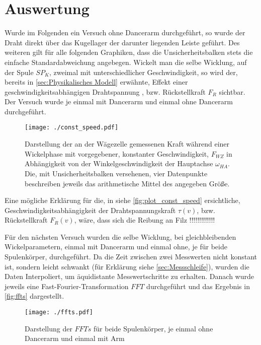 \section{Auswertung}
\label{sec:Auswertung}

Wurde im Folgenden ein Versuch ohne Dancerarm durchgeführt, so wurde der Draht direkt über das Kugellager der darunter liegenden Leiste geführt. Des weiteren gilt für alle folgenden Graphiken, dass die Unsicherheitsbalken stets die einfache Standardabweichung angebegen.\newline
Wickelt man die selbe Wicklung, auf der Spule $SP_K$, zweimal mit unterschiedlicher Geschwindigkeit, so wird der, bereits in \autoref{sec:Physikalisches Modell} erwähnte, Effekt einer geschwindigkeitsabhängigen Drahtspannung , bzw. Rückstellkraft $F_R$ sichtbar. Der Versuch wurde je einmal mit Dancerarm und einmal ohne Dancerarm durchgeführt.

\begin{figure}[H]
    \centering
    \texttt{[image: ./const\_speed.pdf]}
    \caption{Darstellung der an der Wägezelle gemessenen Kraft während einer Wickelphase mit vorgegebener, konstanter Geschwindigkeit, $F_{WZ}$ in Abhängigkeit von der Winkelgeschwindigkeit der Hauptachse $\omega_{HA}$. Die, mit Unsicherheitsbalken versehenen, vier Datenpunkte beschreiben jeweils das arithmetische Mittel des angegeben Größe.}
    \label{fig:plot_const_speed}
\end{figure}


Eine mögliche Erklärung für die, in siehe \autoref{fig:plot_const_speed} ersichtliche, Geschwindigkeitsabhängigkeit der Drahtspannungskraft $\tau(v)$, bzw. Rückstellkraft $F_R(v)$, wäre, dass sich die Reibung an Filz !!!!!!!!!!!!! \newline


Für den nächsten Versuch wurden die selbe Wicklung, bei gleichbleibenden Wickelparametern, einmal mit Dancerarm und einmal ohne, je für beide Spulenkörper, durchgeführt. Da die Zeit zwischen zwei Messwerten nicht konstant ist, sondern leicht schwankt (für Erklärung siehe \autoref{sec:Messschleife}), wurden die Daten Interpoliert, um äquidistante Messwertschritte zu erhalten. Danach wurde jeweils eine Fast-Fourier-Transformation $FFT$ durchgeführt und das Ergebnis in \autoref{fig:ffts} dargestellt.

\begin{figure}[H]
    \centering
    \texttt{[image: ./ffts.pdf]}
    \caption{Darstellung der $FFTs$ für beide Spulenkörper, je einmal ohne Dancerarm und einmal mit Arm}
    \label{fig:ffts}
\end{figure}

